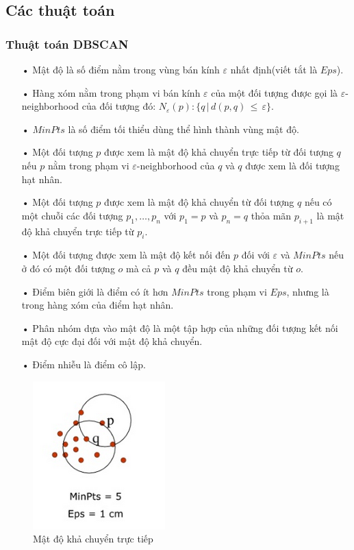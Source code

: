 \subsection{Các thuật toán}
\subsubsection{Thuật toán DBSCAN}
\begin{enumerate}
\item[•]Mật độ là số điểm nằm trong vùng bán kính $\varepsilon$ nhất định(viết tắt là $Eps$).
\item[•]Hàng xóm nằm trong phạm vi bán kính $\varepsilon$ của một đối tượng được gọi là $\varepsilon$-neighborhood của đối tượng đó: $ N_{\varepsilon}(p) : \{q\, |\, d(p,q)\, \leq\, \varepsilon\} $.
\item[•]$MinPts$ là số điểm tối thiểu dùng thể hình thành vùng mật độ.
\item[•]Một đối tượng $p$ được xem là mật độ khả chuyển trực tiếp từ đối tượng $q$ nếu $p$ nằm trong phạm vi $\varepsilon$-neighborhood của $q$ và $q$ được xem là đối tượng hạt nhân.
\item[•]Một đối tượng $p$ được xem là mật độ khả chuyển từ đối tượng $q$ nếu có một chuỗi các đối tượng $p_1, \ldots, p_n$ với $p_1=p$ và $p_n=q$ thỏa mãn $p_{i + 1}$ là mật độ khả chuyển trực tiếp từ $p_i$.
\item[•]Một đối tượng được xem là mật độ kết nối đến $p$ đối với $\varepsilon$ và $MinPts$ nếu ở đó có một đối tượng $o$ mà cả $p$ và $q$ đều mật độ khả chuyển từ $o$.
\item[•]Điểm biên giới là điểm có ít hơn $MinPts$ trong phạm vi $Eps$, nhưng là trong hàng xóm của điểm hạt nhân.
\item[•]Phân nhóm dựa vào mật độ là một tập hợp của những đối tượng kết nối mật độ cực đại đối với mật độ khả chuyển.
\item[•]Điểm nhiễu là điểm cô lập.
\end{enumerate}

\begin{figure}[htp]
\centering
\includegraphics{Images/Density_01}
\caption{Mật độ khả chuyển trực tiếp}
\label{fig:Density_01}
\end{figure}

